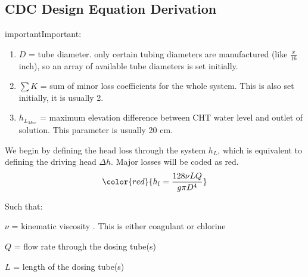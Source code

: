 \documentclass[letterpaper,10pt,english]{sphinxmanual}
\begin{document}
\subsection{CDC Design Equation Derivation}
\label{\detokenize{Flow_Control_and_Measurement/FCM_Derivations:cdc-design-equation-derivation}}\label{\detokenize{Flow_Control_and_Measurement/FCM_Derivations:cdc-design-equation-derivations}}
\begin{sphinxadmonition}{important}{Important:}
\end{sphinxadmonition}
\begin{enumerate}
\item {} 
\(D\) = tube diameter. only certain tubing diameters are manufactured (like \(\frac{x}{16}\) inch), so an array of available tube diameters is set initially.

\item {} 
\(\sum K\) = sum of minor loss coefficients for the whole system. This is also set initially, it is usually 2.

\item {} 
\(h_{L_{Max}}\) = maximum elevation difference between CHT water level and outlet of solution. This parameter is usually 20 cm.

\end{enumerate}

We begin by defining the head loss through the system \(h_L\), which is equivalent to defining the driving head \(\Delta h\). Major losses will be coded as red.
\begin{equation}\label{equation:Flow_Control_and_Measurement/FCM_Derivations:Flow_Control_and_Measurement/FCM_Derivations:20}
\begin{split}\color{red}{
  h_{\rm{f}} = \frac{128\nu LQ}{g\pi D^4}
  }\end{split}
\end{equation}
\begin{DUlineblock}{0em}
\item[] Such that:
\item[] \(\nu\) = kinematic viscosity . This is either coagulant or chlorine
\item[] \(Q\) = flow rate through the dosing tube(s)
\item[] \(L\) = length of the dosing tube(s)
\end{DUlineblock}
\end{document}
